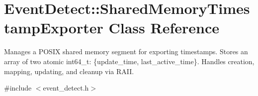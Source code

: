 \hypertarget{classEventDetect_1_1SharedMemoryTimestampExporter}{}\section{Event\+Detect\+:\+:Shared\+Memory\+Timestamp\+Exporter Class Reference}
\label{classEventDetect_1_1SharedMemoryTimestampExporter}


Manages a P\+O\+S\+IX shared memory segment for exporting timestamps. Stores an array of two atomic int64\+\_\+t\+: \{update\+\_\+time, last\+\_\+active\+\_\+time\}. Handles creation, mapping, updating, and cleanup via R\+A\+II.  




{\ttfamily \#include $<$event\+\_\+detect.\+h$>$}

